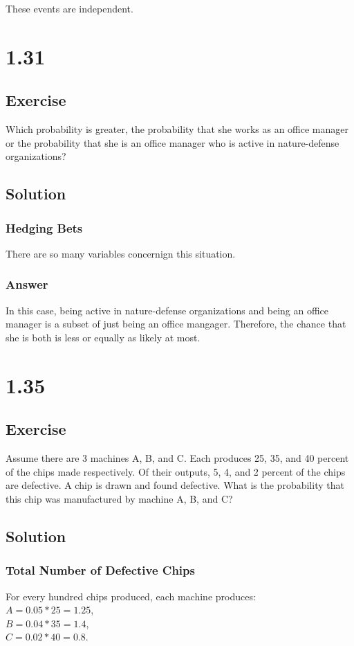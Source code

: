 \documentclass[12pt]{article}
\begin{document}
These events are independent.

\section{1.31}
\subsection{Exercise}
Which probability is greater, the probability that she works as an office manager or the probability that she is an office
manager who is active in nature-defense organizations?

\subsection{Solution}
\subsubsection{Hedging Bets}
There are so many variables concernign this situation. 

\subsubsection{Answer}
In this case, being active in nature-defense organizations and being an office
manager is a subset of just being an office mangager. Therefore, the chance that 
she is both is less or equally as likely at most.

\section{1.35}
\subsection{Exercise}
Assume there are 3 machines A, B, and C. Each produces 25, 35, and 40 percent 
of the chips made respectively. Of their 
outputs, 5, 4, and 2 percent of the chips are defective. A chip is 
drawn and found defective. What is the probability that 
this chip was manufactured by machine A, B, and C?

\subsection{Solution}
\subsubsection{Total Number of Defective Chips}
For every hundred chips produced, each machine produces:\\
$A=0.05*25=1.25$,\\ 
$B=0.04*35=1.4$,\\
$C=0.02*40=0.8$.
\end{document}
